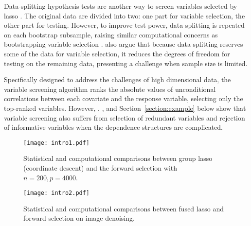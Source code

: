 \documentclass[11pt,review,authoryear]{elsarticle}
\begin{document}
Data-splitting hypothesis tests are another way to screen variables selected by lasso \citep{wasserman2009high, meinshausen2009p,barber2019knockoff,romano2019multiple, diciccio2020exact}. The original data are divided into two: one part for variable selection, the other part for testing. However, to improve test power, data splitting is repeated on each bootstrap subsample, raising similar computational concerns as bootstrapping variable selection \citep{bach2008bolasso,meinshausen2010stability}. \citet{diciccio2020exact} also argue that because data splitting reserves some of the data for variable selection, it reduces the degrees of freedom for testing on the remaining data, presenting a challenge when sample size is limited.

Specifically designed to address the challenges of high dimensional data, the variable screening algorithm \citep{fan2008sure, hall2009using,hall2009usingb, li2012robust, li2012feature} ranks the absolute values of unconditional correlations between each covariate and the response variable, selecting only the top-ranked variables. However, \citet{fan2008sure}, \citet{barut2016conditional}, and Section~\ref{section:example} below show that variable screening also suffers from selection of redundant variables and rejection of informative variables when the dependence structures are complicated.

\begin{figure}[ht]
    \centering
    \texttt{[image: intro1.pdf]}
    \caption{Statistical and computational comparisons between group lasso (coordinate descent) and the forward selection with $n = 200, p = 4000$.}
    \label{fig:intro1}
\end{figure}

\begin{figure}[ht]
    \centering
    \texttt{[image: intro2.pdf]}
    \caption{Statistical and computational comparisons between fused lasso and forward selection on image denoising.}
    \label{fig:intro2}
\end{figure}
\end{document}
